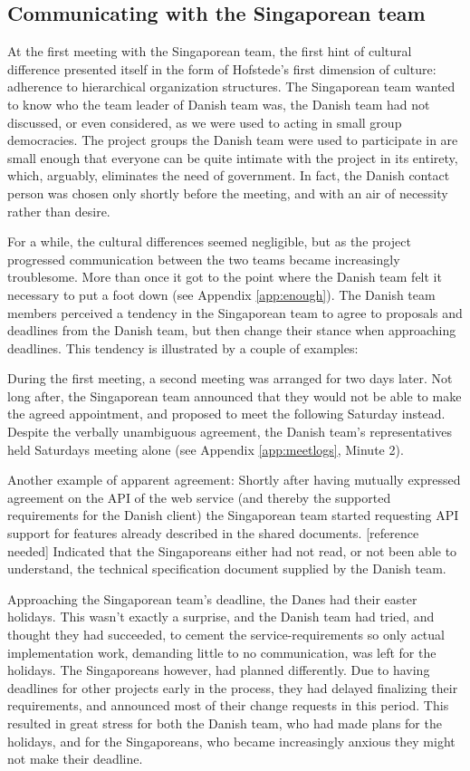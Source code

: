 \subsection{Communicating with the Singaporean team}
\label{sec:communicating}

At the first meeting with the Singaporean team, the first hint of
cultural difference presented itself in the form of Hofstede's first dimension
of culture: adherence to hierarchical organization structures\cite{surprises}.
The Singaporean team wanted to know who the team leader of Danish team was,
the Danish team had not discussed, or even considered, as
we were used to acting in small group democracies. The
project groups the Danish team were used to participate in are small enough
that everyone can be quite intimate with the project in its entirety, which,
arguably, eliminates the need of government. In fact, the Danish contact
person was chosen only shortly before the meeting, and with an air of necessity
rather than desire.

For a while, the cultural differences seemed negligible, but as the project
progressed communication between the two teams became increasingly troublesome.
More than once it got to the point where the Danish team felt it necessary to
put a foot down (see Appendix \ref{app:enough}). The Danish team members perceived a tendency
in the Singaporean team to agree to
proposals and deadlines from the Danish team, but then change their stance when
approaching deadlines. This tendency is illustrated by a couple of examples:

During the first meeting, a second meeting was arranged for two days later. Not
long after, the Singaporean team announced that they would not be able to make
the agreed appointment, and proposed to meet the following Saturday instead.
Despite the verbally unambiguous agreement, the Danish team's
representatives held Saturdays meeting alone (see Appendix \ref{app:meetlogs},
Minute 2).

Another example of apparent agreement: Shortly after having mutually expressed
agreement on the API of the web service (and thereby the supported requirements
for the Danish client) the Singaporean team started requesting API support for
features already described in the shared documents. [reference needed]
Indicated that the Singaporeans either had not read, or not been able to
understand, the technical specification document supplied by the Danish team.

Approaching the Singaporean team's deadline, the Danes had their easter
holidays. This wasn't exactly a surprise, and the Danish team had tried, and
thought they had succeeded, to cement the service-requirements so only actual
implementation work, demanding little to no communication, was left for the
holidays. The Singaporeans however, had planned differently. Due to having
deadlines for other projects early in the process, they had delayed finalizing
their requirements, and announced most of their change requests in this period.
This resulted in great stress for both the Danish team, who had made plans for
the holidays, and for the Singaporeans, who became increasingly anxious they
might not make their deadline.

